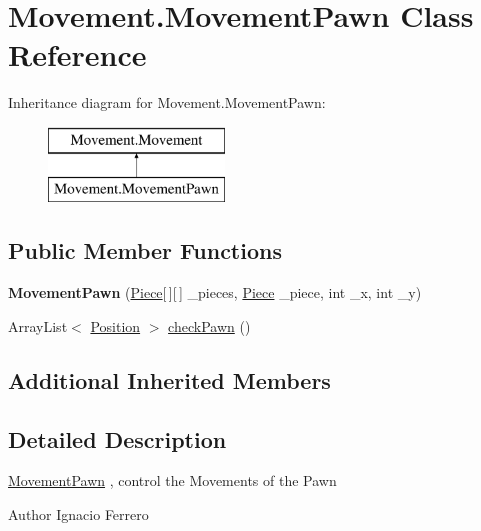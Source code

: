 \hypertarget{class_movement_1_1_movement_pawn}{\section{Movement.\-Movement\-Pawn Class Reference}
\label{class_movement_1_1_movement_pawn}
}
Inheritance diagram for Movement.\-Movement\-Pawn\-:\begin{figure}[H]
\begin{center}
\leavevmode
\includegraphics[height=2.000000cm]{class_movement_1_1_movement_pawn}
\end{center}
\end{figure}
\subsection*{Public Member Functions}
\begin{DoxyCompactItemize}
\item 
\hypertarget{class_movement_1_1_movement_pawn_abeb808553b58fa56862b8d9a0485d8fc}{{\bfseries Movement\-Pawn} (\hyperlink{class_basic___objects_1_1_piece}{Piece}\mbox{[}$\,$\mbox{]}\mbox{[}$\,$\mbox{]} \-\_\-pieces, \hyperlink{class_basic___objects_1_1_piece}{Piece} \-\_\-piece, int \-\_\-x, int \-\_\-y)}\label{class_movement_1_1_movement_pawn_abeb808553b58fa56862b8d9a0485d8fc}

\item 
Array\-List$<$ \hyperlink{class_basic___objects_1_1_position}{Position} $>$ \hyperlink{class_movement_1_1_movement_pawn_a04abde45508cbc1ba288aabc91f3a5ab}{check\-Pawn} ()
\end{DoxyCompactItemize}
\subsection*{Additional Inherited Members}


\subsection{Detailed Description}
\hyperlink{class_movement_1_1_movement_pawn}{Movement\-Pawn} , control the Movements of the Pawn

\begin{DoxyAuthor}{Author}
Ignacio Ferrero 
\end{DoxyAuthor}


